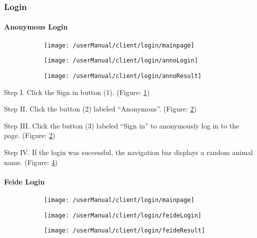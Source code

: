 \subsubsection{Login}

\paragraph{Anonymous Login}
\begin{figure}[H]
    \centering
    \begin{subfigure}{0.60\linewidth}
        \texttt{[image: /userManual/client/login/mainpage]}
       	\caption{}
		\label{fig:annoMainPage}	
    \end{subfigure}
    \begin{subfigure}{0.60\linewidth}
        \texttt{[image: /userManual/client/login/annoLogin]}
      	\caption{}
		\label{fig:annoLogin}	
    \end{subfigure}
    \begin{subfigure}{0.60\linewidth}
    	\texttt{[image: /userManual/client/login/annoResult]}
    	\caption{}
    	\label{fig:annoResult}	
    \end{subfigure}
\end{figure}

\begin{userManualItemlist}
	\item[Step I.] Click the Sign in button (1). (Figure: \ref{fig:annoMainPage})
	\item[Step II.] Click the button (2) labeled “Anonymous”. (Figure: \ref{fig:annoLogin})
	\item[Step III.] Click the button (3) labeled “Sign in” to anonymously log in to the page. (Figure: \ref{fig:annoLogin})
	\item[Step IV.] If the login was successful, the navigation bar displays a random animal name. (Figure: \ref{fig:annoResult})
\end{userManualItemlist}

\paragraph{Feide Login}
\begin{figure}[H]
    \centering
    \begin{subfigure}{0.60\linewidth}
        \texttt{[image: /userManual/client/login/mainpage]}
       	\caption{}
		\label{fig:feideMainPage}	
    \end{subfigure}
    \begin{subfigure}{0.60\linewidth}
        \texttt{[image: /userManual/client/login/feideLogin]}
      	\caption{}
		\label{fig:feideLogin}	
    \end{subfigure}
     \begin{subfigure}{0.60\linewidth}
        \texttt{[image: /userManual/client/login/feideResult]}
      	\caption{}
		\label{fig:feideResult}	
    \end{subfigure}
\end{figure}

